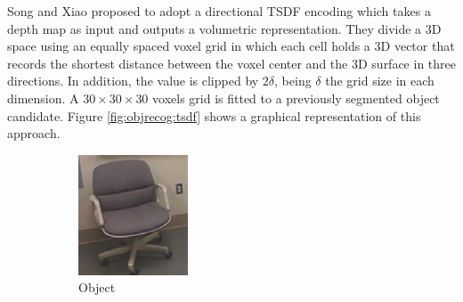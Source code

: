 Song and Xiao \cite{Song2015} proposed to adopt a directional \ac{TSDF} encoding which takes a depth map as input and outputs a volumetric representation. They divide a \acs{3D} space using an equally spaced voxel grid in which each cell holds a \acl{3D} vector that records the shortest distance between the voxel center and the \acl{3D} surface in three directions. In addition, the value is clipped by $2\delta$, being $\delta$ the grid size in each dimension. A $30\times30\times30$ voxels grid is fitted to a previously segmented object candidate. Figure \ref{fig:objrecog:tsdf} shows a graphical representation of this approach.

\begin{figure}[!t]
	\centering
	\hfill
	\begin{subfigure}{0.26\textwidth}
		\centering
		\includegraphics[width=\linewidth]{Figures/ObjRecog/song_chair_rgb}
		\caption{Object}
		\label{subfig:objrecog:tsdf:object}
	\end{subfigure}
	\hfill
	\begin{subfigure}{0.22\textwidth}
		\centering

\end{subfigure}
\end{figure}
